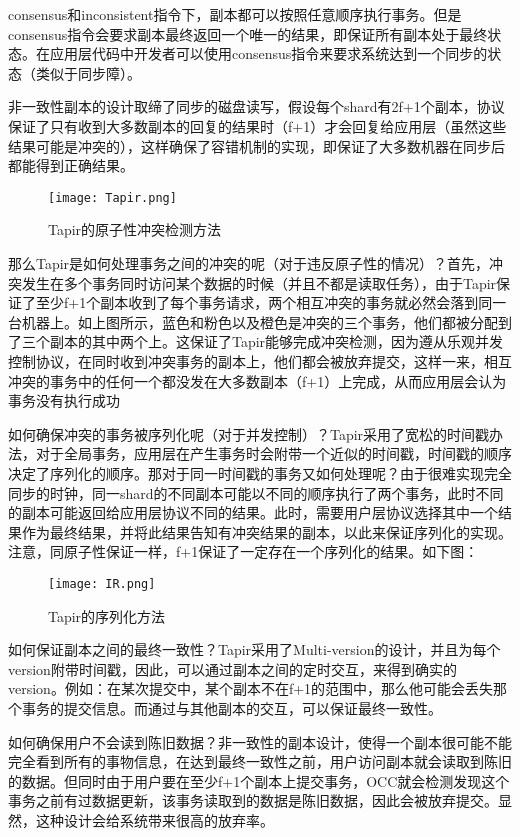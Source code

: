 consensus和inconsistent指令下，副本都可以按照任意顺序执行事务。但是consensus指令会要求副本最终返回一个唯一的结果，即保证所有副本处于最终状态。在应用层代码中开发者可以使用consensus指令来要求系统达到一个同步的状态（类似于同步障）。

非一致性副本\cite{Consistencymodel}的设计取缔了同步的磁盘读写，假设每个shard有2f+1个副本，协议保证了只有收到大多数副本的回复的结果时（f+1）才会回复给应用层（虽然这些结果可能是冲突的），这样确保了容错机制的实现，即保证了大多数机器在同步后都能得到正确结果。

\begin{figure}[htb]
  \centering
  \texttt{[image: Tapir.png]}
  \caption{Tapir的原子性冲突检测方法}
  \label{fig:badge}
\end{figure}

那么Tapir是如何处理事务之间的冲突的呢（对于违反原子性的情况）？首先，冲突发生在多个事务同时访问某个数据的时候（并且不都是读取任务），由于Tapir保证了至少f+1个副本收到了每个事务请求，两个相互冲突的事务就必然会落到同一台机器上。如上图所示，蓝色和粉色以及橙色是冲突的三个事务，他们都被分配到了三个副本的其中两个上。这保证了Tapir能够完成冲突检测，因为遵从乐观并发控制协议，在同时收到冲突事务的副本上，他们都会被放弃提交，这样一来，相互冲突的事务中的任何一个都没发在大多数副本（f+1）上完成，从而应用层会认为事务没有执行成功

如何确保冲突的事务被序列化呢（对于并发控制）？Tapir采用了宽松的时间戳办法，对于全局事务，应用层在产生事务时会附带一个近似的时间戳，时间戳的顺序决定了序列化的顺序。那对于同一时间戳的事务又如何处理呢？由于很难实现完全同步的时钟，同一shard的不同副本可能以不同的顺序执行了两个事务，此时不同的副本可能返回给应用层协议不同的结果。此时，需要用户层协议选择其中一个结果作为最终结果，并将此结果告知有冲突结果的副本，以此来保证序列化的实现。注意，同原子性保证一样，f+1保证了一定存在一个序列化的结果。如下图：

\begin{figure}[htb]
  \centering
  \texttt{[image: IR.png]}
  \caption{Tapir的序列化方法}
  \label{fig:badge}
\end{figure}

如何保证副本之间的最终一致性？Tapir采用了Multi-version的设计，并且为每个version附带时间戳，因此，可以通过副本之间的定时交互，来得到确实的version。例如：在某次提交中，某个副本不在f+1的范围中，那么他可能会丢失那个事务的提交信息。而通过与其他副本的交互，可以保证最终一致性。

如何确保用户不会读到陈旧数据？非一致性的副本设计，使得一个副本很可能不能完全看到所有的事物信息，在达到最终一致性之前，用户访问副本就会读取到陈旧的数据。但同时由于用户要在至少f+1个副本上提交事务，OCC就会检测发现这个事务之前有过数据更新，该事务读取到的数据是陈旧数据，因此会被放弃提交。显然，这种设计会给系统带来很高的放弃率。

